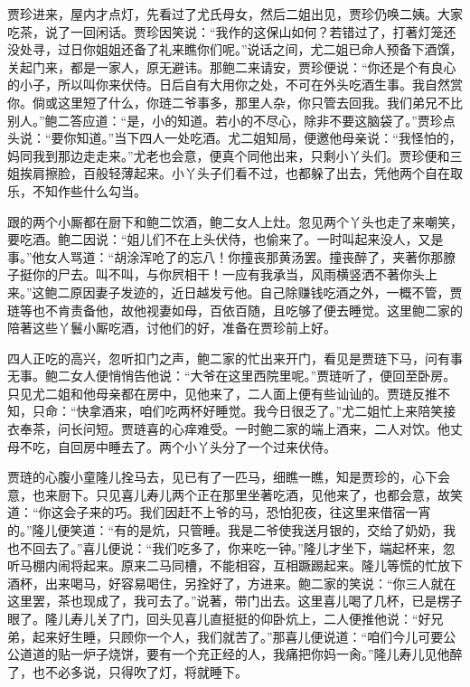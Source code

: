 \begin{parag}


    贾珍进来，屋内才点灯，先看过了尤氏母女，然后二姐出见，贾珍仍唤二姨。大家吃茶，说了一回闲话。贾珍因笑说：“我作的这保山如何？若错过了，打著灯笼还没处寻，过日你姐姐还备了礼来瞧你们呢。”说话之间，尤二姐已命人预备下酒馔，关起门来，都是一家人，原无避讳。那鲍二来请安，贾珍便说：“你还是个有良心的小子，所以叫你来伏侍。日后自有大用你之处，不可在外头吃酒生事。我自然赏你。倘或这里短了什么，你琏二爷事多，那里人杂，你只管去回我。我们弟兄不比别人。”鲍二答应道：“是，小的知道。若小的不尽心，除非不要这脑袋了。”贾珍点头说：“要你知道。”当下四人一处吃酒。尤二姐知局，便邀他母亲说：“我怪怕的，妈同我到那边走走来。”尤老也会意，便真个同他出来，只剩小丫头们。贾珍便和三姐挨肩擦脸，百般轻薄起来。小丫头子们看不过，也都躲了出去，凭他两个自在取乐，不知作些什么勾当。
\end{parag}


\begin{parag}


    跟的两个小厮都在厨下和鲍二饮酒，鲍二女人上灶。忽见两个丫头也走了来嘲笑，要吃酒。鲍二因说：“姐儿们不在上头伏侍，也偷来了。一时叫起来没人，又是事。”他女人骂道：“胡涂浑呛了的忘八！你撞丧那黄汤罢。撞丧醉了，夹著你那膫子挺你的尸去。叫不叫，与你屄相干！一应有我承当，风雨横竖洒不著你头上来。”这鲍二原因妻子发迹的，近日越发亏他。自己除赚钱吃酒之外，一概不管，贾琏等也不肯责备他，故他视妻如母，百依百随，且吃够了便去睡觉。这里鲍二家的陪著这些丫鬟小厮吃酒，讨他们的好，准备在贾珍前上好。
\end{parag}


\begin{parag}


    四人正吃的高兴，忽听扣门之声，鲍二家的忙出来开门，看见是贾琏下马，问有事无事。鲍二女人便悄悄告他说：“大爷在这里西院里呢。”贾琏听了，便回至卧房。只见尤二姐和他母亲都在房中，见他来了，二人面上便有些讪讪的。贾琏反推不知，只命：“快拿酒来，咱们吃两杯好睡觉。我今日很乏了。”尤二姐忙上来陪笑接衣奉茶，问长问短。贾琏喜的心痒难受。一时鲍二家的端上酒来，二人对饮。他丈母不吃，自回房中睡去了。两个小丫头分了一个过来伏侍。
\end{parag}


\begin{parag}


    贾琏的心腹小童隆儿拴马去，见已有了一匹马，细瞧一瞧，知是贾珍的，心下会意，也来厨下。只见喜儿寿儿两个正在那里坐著吃酒，见他来了，也都会意，故笑道：“你这会子来的巧。我们因赶不上爷的马，恐怕犯夜，往这里来借宿一宵的。”隆儿便笑道：“有的是炕，只管睡。我是二爷使我送月银的，交给了奶奶，我也不回去了。”喜儿便说：“我们吃多了，你来吃一钟。”隆儿才坐下，端起杯来，忽听马棚内闹将起来。原来二马同槽，不能相容，互相蹶踢起来。隆儿等慌的忙放下酒杯，出来喝马，好容易喝住，另拴好了，方进来。鲍二家的笑说：“你三人就在这里罢，茶也现成了，我可去了。”说著，带门出去。这里喜儿喝了几杯，已是楞子眼了。隆儿寿儿关了门，回头见喜儿直挺挺的仰卧炕上，二人便推他说：“好兄弟，起来好生睡，只顾你一个人，我们就苦了。”那喜儿便说道：“咱们今儿可要公公道道的贴一炉子烧饼，要有一个充正经的人，我痛把你妈一肏。”隆儿寿儿见他醉了，也不必多说，只得吹了灯，将就睡下。
\end{parag}


